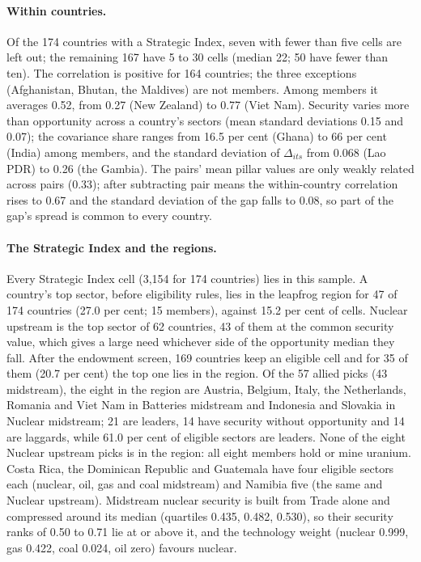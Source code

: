 \paragraph{Within countries.} Of the 174 countries with a Strategic Index, seven with fewer than
five cells are left out; the remaining 167 have 5 to 30 cells (median 22; 50 have fewer than ten).
The correlation is positive for 164 countries; the three exceptions (Afghanistan, Bhutan, the
Maldives) are not members. Among members it averages 0.52, from 0.27 (New Zealand) to 0.77 (Viet
Nam). Security varies more than opportunity across a country's sectors (mean standard deviations
0.15 and 0.07); the covariance share ranges from 16.5 per cent (Ghana) to 66 per cent (India) among
members, and the standard deviation of $\Delta_{its}$ from 0.068 (Lao PDR) to 0.26 (the Gambia).
The pairs' mean pillar values are only weakly related across pairs (0.33); after subtracting pair
means the within-country correlation rises to 0.67 and the standard deviation of the gap falls to
0.08, so part of the gap's spread is common to every country.

\paragraph{The Strategic Index and the regions.} Every Strategic Index cell (3{,}154 for 174
countries) lies in this sample. A country's top sector, before eligibility rules, lies in the
leapfrog region for 47 of 174 countries (27.0 per cent; 15 members), against 15.2 per cent of
cells. Nuclear upstream is the top sector of 62 countries, 43 of them at the common security value,
which gives a large need whichever side of the opportunity median they fall. After the endowment
screen, 169 countries keep an eligible cell and for 35 of them (20.7 per cent) the top one lies in
the region. Of the 57 allied picks (43 midstream), the eight in the region are Austria, Belgium,
Italy, the Netherlands, Romania and Viet Nam in Batteries midstream and Indonesia and Slovakia in
Nuclear midstream; 21 are leaders, 14 have security without opportunity and 14 are laggards, while
61.0 per cent of eligible sectors are leaders. None of the eight Nuclear upstream picks is in the
region: all eight members hold or mine uranium. Costa Rica, the Dominican Republic and Guatemala have
four eligible sectors each (nuclear, oil, gas and coal midstream) and Namibia five (the same and
Nuclear upstream). Midstream nuclear security is built from Trade alone and compressed around its
median (quartiles 0.435, 0.482, 0.530), so their security ranks of 0.50 to 0.71 lie at or above it,
and the technology weight (nuclear 0.999, gas 0.422, coal 0.024, oil zero) favours nuclear.

